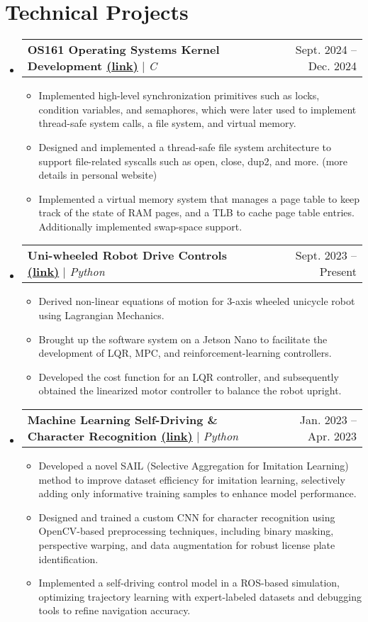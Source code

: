 \documentclass[letterpaper,11pt]{article}
\makeatletter
\newcommand{\resumeItem}[1]{
  \item\small{
    {#1 \vspace{-2pt}}
  }
}
\newcommand{\resumeProjectHeading}[2]{
    \item
    \begin{tabular*}{0.97\textwidth}{l@{\extracolsep{\fill}}r}
      \small#1 & #2 \\
    \end{tabular*}\vspace{-7pt}
}
\newcommand{\resumeSubHeadingListStart}{\begin{itemize}[leftmargin=0.15in, label={}]}
\newcommand{\resumeSubHeadingListEnd}{\end{itemize}}
\newcommand{\resumeItemListStart}{\begin{itemize}}
\newcommand{\resumeItemListEnd}{\end{itemize}\vspace{-5pt}}
\makeatother
\begin{document}
\section{Technical Projects}
    \resumeSubHeadingListStart
      \resumeProjectHeading
          {\textbf{OS161 Operating Systems Kernel Development \href{https://1mackenziekyle.github.io/os.html}{(\underline{link})}}
          $|$ \emph{C}
          }{Sept. 2024 -- Dec. 2024}
          \resumeItemListStart
            \resumeItem{Implemented high-level synchronization primitives such as locks, condition variables, and semaphores, which were later used 
            to implement thread-safe system calls, a file system, and virtual memory.}
            \resumeItem{Designed and implemented a thread-safe file system architecture to support file-related syscalls such as open, close, dup2, and more. (more details in personal website)}
            \resumeItem{Implemented a virtual memory system that manages a page table to keep track of the state of RAM pages, 
            and a TLB to cache page table entries. Additionally implemented swap-space support.}
          \resumeItemListEnd
        \resumeProjectHeading
          {\textbf{Uni-wheeled Robot Drive Controls \href{https://1mackenziekyle.github.io/learning-to-balance.html}{(\underline{link})}}
          $|$ \emph{Python}
          }{Sept. 2023 -- Present}
          \resumeItemListStart
            \resumeItem{Derived non-linear equations of motion for 3-axis wheeled unicycle robot using Lagrangian Mechanics.}
            \resumeItem{Brought up the software system on a Jetson Nano to facilitate the development of LQR, MPC, and reinforcement-learning controllers.}
            \resumeItem{Developed the cost function for an LQR controller, and subsequently obtained the linearized motor controller to balance the robot upright.}
          \resumeItemListEnd
        \resumeProjectHeading
          {\textbf{Machine Learning Self-Driving \& Character Recognition \href{https://1mackenziekyle.github.io/machine-learning.html}{(\underline{link})}}
          $|$ \emph{Python}
          }{Jan. 2023 -- Apr. 2023}
          \resumeItemListStart
            \resumeItem{Developed a novel SAIL (Selective Aggregation for Imitation Learning) method to improve dataset efficiency for imitation learning, selectively adding only informative training samples to enhance model performance.}
            \resumeItem{Designed and trained a custom CNN for character recognition using OpenCV-based preprocessing techniques, including binary masking, perspective warping, and data augmentation for robust license plate identification.}
            \resumeItem{Implemented a self-driving control model in a ROS-based simulation, optimizing trajectory learning with expert-labeled datasets and debugging tools to refine navigation accuracy.}
          \resumeItemListEnd
    \resumeSubHeadingListEnd
\end{document}
